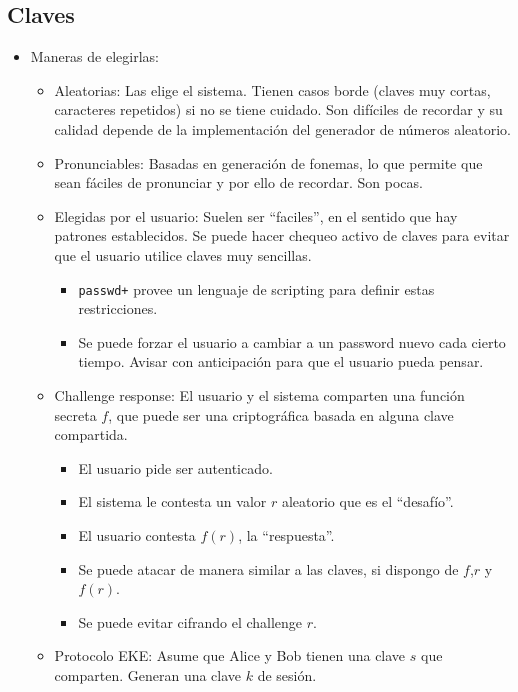 \subsection{Claves}

\begin{itemize}
	\item Maneras de elegirlas: \begin{itemize}
		\item Aleatorias: Las elige el sistema. Tienen casos borde (claves muy cortas, caracteres repetidos) si no se tiene
		cuidado. Son difíciles de recordar y su calidad depende de la implementación del generador de números aleatorio.
		\item Pronunciables: Basadas en generación de fonemas, lo que permite que sean fáciles de pronunciar y por ello de
		recordar. Son pocas.
		\item Elegidas por el usuario: Suelen ser ``faciles'', en el sentido que hay patrones establecidos. Se puede hacer
		chequeo activo de claves para evitar que el usuario utilice claves muy sencillas. \begin{itemize}
			\item \texttt{passwd+} provee un lenguaje de scripting para definir estas restricciones.
			\item Se puede forzar el usuario a cambiar a un password nuevo cada cierto tiempo. Avisar con anticipación para que el
			usuario pueda pensar.
		\end{itemize}
		\item Challenge response: El usuario y el sistema comparten una función secreta $f$, que puede ser una criptográfica
		basada en alguna clave compartida. \begin{itemize}
			\item El usuario pide ser autenticado.
			\item El sistema le contesta un valor $r$ aleatorio que es el ``desafío''.
			\item El usuario contesta $f(r)$, la ``respuesta''.
			\item Se puede atacar de manera similar a las claves, si dispongo de $f$,$r$ y $f(r)$.
			\item Se puede evitar cifrando el challenge $r$. 
		\end{itemize}
		\item Protocolo EKE: Asume que Alice y Bob tienen una clave $s$ que comparten. Generan una clave $k$ de sesión.



\end{itemize}
\end{itemize}
